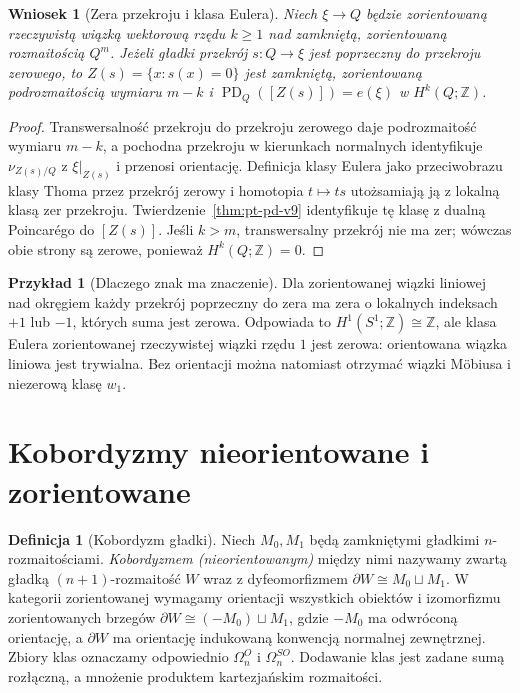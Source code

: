 \documentclass[11pt,a4paper,oneside]{report}
\newcommand{\Z}{\mathbb{Z}}
\theoremstyle{plain}
\newtheorem{wniosek}[twierdzenie]{Wniosek}
\theoremstyle{definition}
\newtheorem{definicja}[twierdzenie]{Definicja}
\newtheorem{przyklad}[twierdzenie]{Przykład}
\theoremstyle{remark}
\begin{document}
\begin{wniosek}[Zera przekroju i klasa Eulera]
\label{cor:euler-zero-v9}
Niech $\xi\to Q$ będzie zorientowaną rzeczywistą wiązką
wektorową rzędu $k\ge1$ nad zamkniętą, zorientowaną
rozmaitością $Q^m$. Jeżeli gładki przekrój
$s:Q\to\xi$ jest poprzeczny do przekroju zerowego,
to $Z(s)=\{x:s(x)=0\}$ jest zamkniętą, zorientowaną
podrozmaitością wymiaru $m-k$ i
$\operatorname{PD}_Q([Z(s)])=e(\xi)$ w $H^k(Q;\Z)$.
\end{wniosek}
\begin{proof}
Transwersalność przekroju do przekroju zerowego
daje podrozmaitość wymiaru $m-k$, a pochodna przekroju
w kierunkach normalnych identyfikuje
$\nu_{Z(s)/Q}$ z $\xi|_{Z(s)}$ i przenosi orientację.
Definicja klasy Eulera jako przeciwobrazu klasy Thoma
przez przekrój zerowy i homotopia $t\mapsto t s$
utożsamiają ją z lokalną klasą zer przekroju.
Twierdzenie~\ref{thm:pt-pd-v9} identyfikuje tę klasę
z dualną Poincarégo do $[Z(s)]$. Jeśli $k>m$,
transwersalny przekrój nie ma zer; wówczas obie strony
są zerowe, ponieważ $H^k(Q;\Z)=0$.
\end{proof}

\begin{przyklad}[Dlaczego znak ma znaczenie]
Dla zorientowanej wiązki liniowej nad okręgiem
każdy przekrój poprzeczny do zera ma zera o
lokalnych indeksach $+1$ lub $-1$, których suma
jest zerowa. Odpowiada to $H^1(S^1;\Z)\cong\Z$,
ale klasa Eulera zorientowanej rzeczywistej wiązki
rzędu $1$ jest zerowa: orientowana wiązka liniowa
jest trywialna. Bez orientacji można natomiast otrzymać
wiązki Möbiusa i niezerową klasę $w_1$.
\end{przyklad}

\section{Kobordyzmy nieorientowane i zorientowane}
\begin{definicja}[Kobordyzm gładki]
Niech $M_0,M_1$ będą zamkniętymi gładkimi
$n$-rozmaitościami. \emph{Kobordyzmem (nieorientowanym)}
między nimi nazywamy zwartą gładką
$(n+1)$-rozmaitość $W$ wraz z dyfeomorfizmem
$\partial W\cong M_0\sqcup M_1$.
W kategorii zorientowanej wymagamy orientacji wszystkich
obiektów i izomorfizmu zorientowanych brzegów
$\partial W\cong (-M_0)\sqcup M_1$, gdzie
$-M_0$ ma odwróconą orientację, a $\partial W$ ma
orientację indukowaną konwencją normalnej zewnętrznej.
Zbiory klas oznaczamy odpowiednio
$\Omega_n^O$ i $\Omega_n^{SO}$. Dodawanie klas
jest zadane sumą rozłączną, a mnożenie produktem
kartezjańskim rozmaitości.
\end{definicja}
\end{document}
